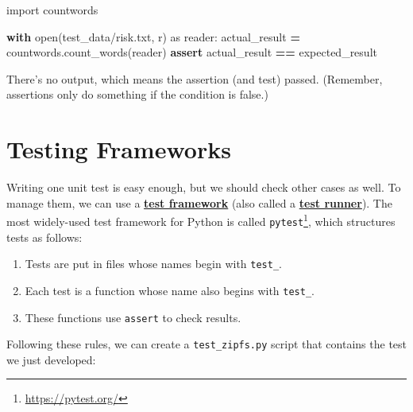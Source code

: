 \documentclass[
]{krantz}
\makeatletter
\newenvironment{Shaded}{\begin{snugshade}}{\end{snugshade}}
\newcommand{\BuiltInTok}[1]{#1}
\newcommand{\ControlFlowTok}[1]{\textcolor[rgb]{0.13,0.29,0.53}{\textbf{#1}}}
\newcommand{\ImportTok}[1]{#1}
\newcommand{\NormalTok}[1]{#1}
\newcommand{\OperatorTok}[1]{\textcolor[rgb]{0.81,0.36,0.00}{\textbf{#1}}}
\newcommand{\StringTok}[1]{\textcolor[rgb]{0.31,0.60,0.02}{#1}}
\providecommand{\tightlist}{%
  \setlength{\itemsep}{0pt}\setlength{\parskip}{0pt}}
\renewcommand{\href}[2]{#2\footnote{\url{#1}}}
\newenvironment{kframe}{%
\medskip{}
\setlength{\fboxsep}{.8em}
 \def\at@end@of@kframe{}%
 \ifinner\ifhmode%
  \def\at@end@of@kframe{\end{minipage}}%
  \begin{minipage}{\columnwidth}%
 \fi\fi%
 \def\FrameCommand##1{\hskip\@totalleftmargin \hskip-\fboxsep
 \colorbox{shadecolor}{##1}\hskip-\fboxsep
     \hskip-\linewidth \hskip-\@totalleftmargin \hskip\columnwidth}%
 \MakeFramed {\advance\hsize-\width
   \@totalleftmargin\z@ \linewidth\hsize
   \@setminipage}}%
 {\par\unskip\endMakeFramed%
 \at@end@of@kframe}
\renewenvironment{Shaded}{\begin{kframe}}{\end{kframe}}
\newcommand{\gref}[2]{\hyperlink{#2}{\textbf{#1}}}
\makeatother
\begin{document}
\begin{Shaded}
\begin{Highlighting}[]
\ImportTok{import}\NormalTok{ countwords}

\ControlFlowTok{with} \BuiltInTok{open}\NormalTok{(}\StringTok{\textquotesingle{}test\_data/risk.txt\textquotesingle{}}\NormalTok{, }\StringTok{\textquotesingle{}r\textquotesingle{}}\NormalTok{) }\ImportTok{as}\NormalTok{ reader:}
\NormalTok{    actual\_result }\OperatorTok{=}\NormalTok{ countwords.count\_words(reader)}
\ControlFlowTok{assert}\NormalTok{ actual\_result }\OperatorTok{==}\NormalTok{ expected\_result}
\end{Highlighting}
\end{Shaded}

There's no output,
which means the assertion (and test) passed.
(Remember, assertions only do something if the condition is false.)

\hypertarget{testing-framework}{%
\section{Testing Frameworks}\label{testing-framework}}

Writing one unit test is easy enough,
but we should check other cases as well.
To manage them,
we can use a \gref{test framework}{test\_framework}
(also called a \gref{test runner}{test\_runner}).
The most widely-used test framework for Python is called \href{https://pytest.org/}{\texttt{pytest}},
which structures tests as follows:

\begin{enumerate}
\def\labelenumi{\arabic{enumi}.}
\tightlist
\item
  Tests are put in files whose names begin with \texttt{test\_}.
\item
  Each test is a function whose name also begins with \texttt{test\_}.
\item
  These functions use \texttt{assert} to check results.
\end{enumerate}

Following these rules,
we can create a \texttt{test\_zipfs.py} script that contains the test we just developed:
\end{document}
